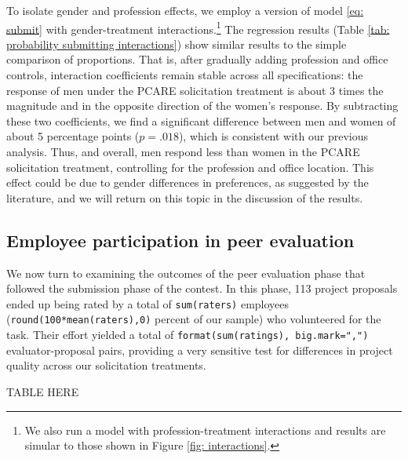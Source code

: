\documentclass[11pt, titlepage]{article}
\begin{document}


To isolate gender and profession effects, we employ a version of model
\eqref{eq: submit} with gender-treatment interactions.\footnote{We also
  run a model with profession-treatment interactions and results are
  simular to those shown in Figure \ref{fig: interactions}.} The
regression results (Table
\ref{tab: probability submitting interactions}) show similar results to
the simple comparison of proportions. That is, after gradually adding
profession and office controls, interaction coefficients remain stable
across all specifications: the response of men under the PCARE
solicitation treatment is about 3 times the magnitude and in the
opposite direction of the women's response. By subtracting these two
coefficients, we find a significant difference between men and women of
about 5 percentage points (\(p=.018\)), which is consistent with our
previous analysis. Thus, and overall, men respond less than women in the
PCARE solicitation treatment, controlling for the profession and office
location. This effect could be due to gender differences in preferences,
as suggested by the literature, and we will return on this topic in the
discussion of the results.

\subsection{Employee participation in peer
evaluation}\label{employee-participation-in-peer-evaluation}

We now turn to examining the outcomes of the peer evaluation phase that
followed the submission phase of the contest. In this phase, 113 project
proposals ended up being rated by a total of \texttt{sum(raters)}
employees (\texttt{round(100*mean(raters),0)} percent of our sample) who
volunteered for the task. Their effort yielded a total of
\texttt{format(sum(ratings),\ big.mark=",")} evaluator-proposal pairs,
providing a very sensitive test for differences in project quality
across our solicitation treatments.

TABLE HERE
\end{document}
